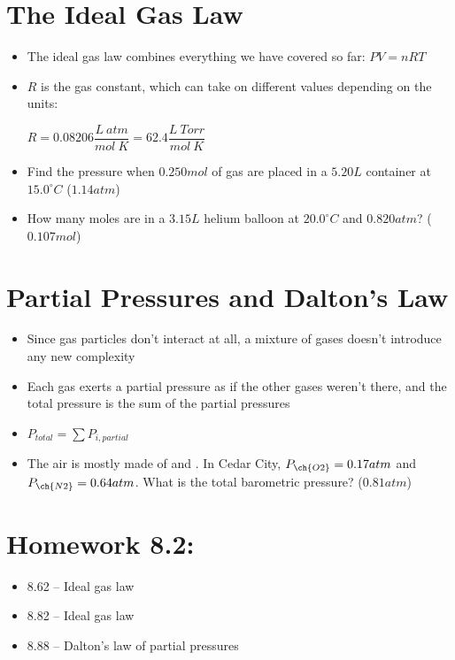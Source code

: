 \documentclass[12pt, openany, letterpaper]{memoir}
\begin{document}
\section{The Ideal Gas Law}
\begin{itemize}
	\item The ideal gas law combines everything we have covered so far: $PV=nRT$
	\item $R$ is the gas constant, which can take on different values depending on the units:

	      $R=0.08206\dfrac{L~atm}{mol~K} = 62.4\dfrac{L~Torr}{mol~K}$
	\item Find the pressure when $0.250mol$ of gas are placed in a $5.20L$ container at $15.0^\circ C$ ($1.14atm$)
	\item How many moles are in a $3.15L$ helium balloon at $20.0^\circ C$ and $0.820atm$? ($0.107mol$)
\end{itemize}

\section{Partial Pressures and Dalton's Law}
\begin{itemize}
	\item Since gas particles don't interact at all, a mixture of gases doesn't introduce any new complexity
	\item Each gas exerts a partial pressure as if the other gases weren't there, and the total pressure is the sum of the partial pressures
	\item $P_{total} = \sum P_{i, partial}$
	\item The air is mostly made of  and . In Cedar City, $P_{\ch{O2}}=0.17atm$ and $P_{\ch{N2}}=0.64atm$. What is the total barometric pressure? ($0.81atm$)
\end{itemize}

\section*{Homework 8.2:}
\begin{itemize}
	\item 8.62 -- Ideal gas law
	\item 8.82 -- Ideal gas law
	\item 8.88 -- Dalton's law of partial pressures
\end{itemize}
\end{document}
